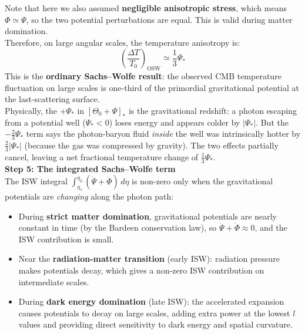 \begin{foundation}
    Note that here we also assumed \textbf{negligible anisotropic stress}, which means $\Phi \simeq \Psi$, so the two potential perturbations are equal. This is valid during matter domination. \\

    Therefore, on large angular scales, the temperature anisotropy is:
    \[
        \left(\frac{\Delta T}{T_0}\right)_{\mathrm{OSW}} \simeq \frac{1}{3}\Psi_*
    \]
    This is the \textbf{ordinary Sachs--Wolfe result}: the observed CMB temperature fluctuation on large scales is one-third of the primordial gravitational potential at the last-scattering surface. \\
    
    Physically, the $+\Psi_*$ in $[\Theta_0 + \Psi]_*$ is the gravitational redshift: a photon escaping from a potential well ($\Psi_* < 0$) loses energy and appears colder by $|\Psi_*|$. But the $-\frac{2}{3}\Psi_*$ term says the photon-baryon fluid \emph{inside} the well was intrinsically hotter by $\frac{2}{3}|\Psi_*|$ (because the gas was compressed by gravity). The two effects partially cancel, leaving a net fractional temperature change of $\frac{1}{3}\Psi_*$. \\

    \textbf{Step 5: The integrated Sachs--Wolfe term} \\
    The ISW integral $\int_{\eta_*}^{\eta_0}(\dot{\Psi}+\dot{\Phi})\,d\eta$ is non-zero only when the gravitational potentials are \emph{changing} along the photon path:
    \begin{itemize}
        \item During \textbf{strict matter domination}, gravitational potentials are nearly constant in time (by the Bardeen conservation law), so $\dot{\Psi}+\dot{\Phi}\approx 0$, and the ISW contribution is small.
        \item Near the \textbf{radiation-matter transition} (early ISW): radiation pressure makes potentials decay, which gives a non-zero ISW contribution on intermediate scales.
        \item During \textbf{dark energy domination} (late ISW): the accelerated expansion causes potentials to decay on large scales, adding extra power at the lowest $l$ values and providing direct sensitivity to dark energy and spatial curvature.
    \end{itemize}
\end{foundation}

